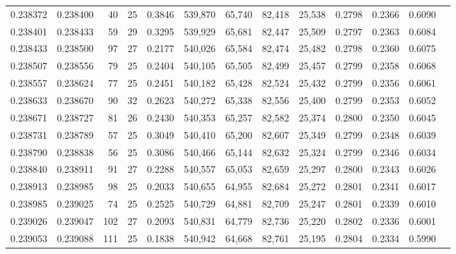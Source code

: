 \begin{tabular}{rrrrrrrrrrrrr}
0.238372 & 0.238400 &  40 &  25 &                                     0.3846 & 539,870 &  65,740 &  82,418 &  25,538 & 0.2798 & 0.2366 & 0.6090 \\
0.238401 & 0.238433 &  59 &  29 &                                     0.3295 & 539,929 &  65,681 &  82,447 &  25,509 & 0.2797 & 0.2363 & 0.6084 \\
0.238433 & 0.238500 &  97 &  27 &                                     0.2177 & 540,026 &  65,584 &  82,474 &  25,482 & 0.2798 & 0.2360 & 0.6075 \\
0.238507 & 0.238556 &  79 &  25 &                                     0.2404 & 540,105 &  65,505 &  82,499 &  25,457 & 0.2799 & 0.2358 & 0.6068 \\
0.238557 & 0.238624 &  77 &  25 &                                     0.2451 & 540,182 &  65,428 &  82,524 &  25,432 & 0.2799 & 0.2356 & 0.6061 \\
0.238633 & 0.238670 &  90 &  32 &                                     0.2623 & 540,272 &  65,338 &  82,556 &  25,400 & 0.2799 & 0.2353 & 0.6052 \\
0.238671 & 0.238727 &  81 &  26 &                                     0.2430 & 540,353 &  65,257 &  82,582 &  25,374 & 0.2800 & 0.2350 & 0.6045 \\
0.238731 & 0.238789 &  57 &  25 &                                     0.3049 & 540,410 &  65,200 &  82,607 &  25,349 & 0.2799 & 0.2348 & 0.6039 \\
0.238790 & 0.238838 &  56 &  25 &                                     0.3086 & 540,466 &  65,144 &  82,632 &  25,324 & 0.2799 & 0.2346 & 0.6034 \\
0.238840 & 0.238911 &  91 &  27 &                                     0.2288 & 540,557 &  65,053 &  82,659 &  25,297 & 0.2800 & 0.2343 & 0.6026 \\
0.238913 & 0.238985 &  98 &  25 &                                     0.2033 & 540,655 &  64,955 &  82,684 &  25,272 & 0.2801 & 0.2341 & 0.6017 \\
0.238985 & 0.239025 &  74 &  25 &                                     0.2525 & 540,729 &  64,881 &  82,709 &  25,247 & 0.2801 & 0.2339 & 0.6010 \\
0.239026 & 0.239047 & 102 &  27 &                                     0.2093 & 540,831 &  64,779 &  82,736 &  25,220 & 0.2802 & 0.2336 & 0.6001 \\
0.239053 & 0.239088 & 111 &  25 &                                     0.1838 & 540,942 &  64,668 &  82,761 &  25,195 & 0.2804 & 0.2334 & 0.5990 \\

\end{tabular}
